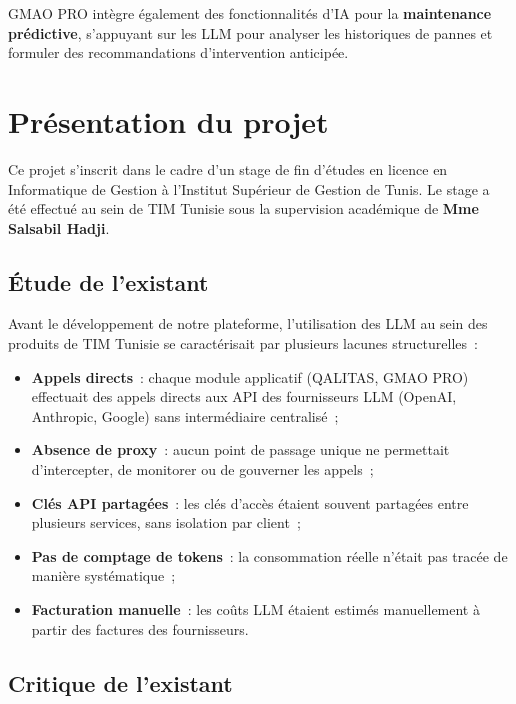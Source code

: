 GMAO PRO intègre également des fonctionnalités d'IA pour la \textbf{maintenance prédictive}, s'appuyant sur les LLM pour analyser les historiques de pannes et formuler des recommandations d'intervention anticipée.


\section{Présentation du projet}
\label{sec:projet_overview}

Ce projet s'inscrit dans le cadre d'un stage de fin d'études en licence en Informatique de Gestion à l'Institut Supérieur de Gestion de Tunis. Le stage a été effectué au sein de TIM Tunisie sous la supervision académique de \textbf{Mme Salsabil Hadji}.

\subsection{Étude de l'existant}

Avant le développement de notre plateforme, l'utilisation des LLM au sein des produits de TIM Tunisie se caractérisait par plusieurs lacunes structurelles~:

\begin{itemize}[noitemsep]
    \item \textbf{Appels directs}~: chaque module applicatif (QALITAS, GMAO PRO) effectuait des appels directs aux API des fournisseurs LLM (OpenAI, Anthropic, Google) sans intermédiaire centralisé~;
    \item \textbf{Absence de proxy}~: aucun point de passage unique ne permettait d'intercepter, de monitorer ou de gouverner les appels~;
    \item \textbf{Clés API partagées}~: les clés d'accès étaient souvent partagées entre plusieurs services, sans isolation par client~;
    \item \textbf{Pas de comptage de tokens}~: la consommation réelle n'était pas tracée de manière systématique~;
    \item \textbf{Facturation manuelle}~: les coûts LLM étaient estimés manuellement à partir des factures des fournisseurs.
\end{itemize}

\subsection{Critique de l'existant}

